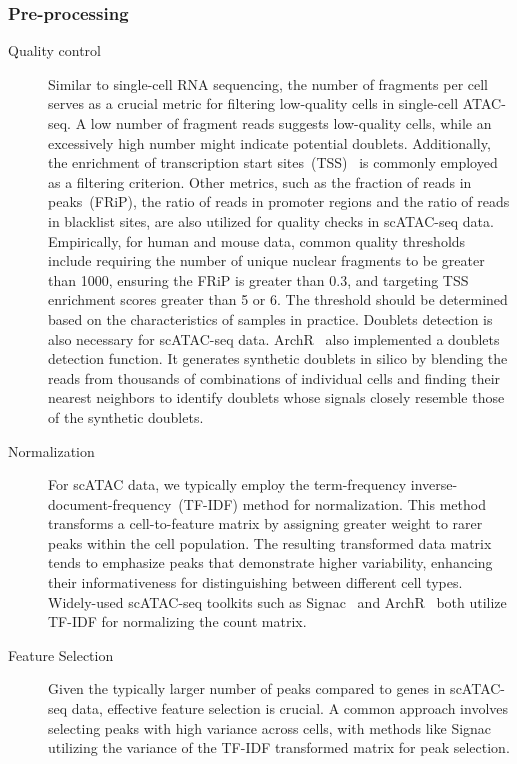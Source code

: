 \subsubsection{Pre-processing}
\begin{description}
	\item[Quality control]
	Similar to single-cell RNA sequencing, the number of fragments per cell serves as a crucial metric for filtering low-quality cells in single-cell ATAC-seq. A low number of fragment reads suggests low-quality cells, while an excessively high number might indicate potential doublets. Additionally, the enrichment of transcription start sites~(TSS)~\citep{Granja2021} is commonly employed as a filtering criterion. Other metrics, such as the fraction of reads in peaks~(FRiP), the ratio of reads in promoter regions and the ratio of reads in blacklist sites, are also utilized for quality checks in scATAC-seq data. Empirically, for human and mouse data, common quality thresholds include requiring the number of unique nuclear fragments to be greater than 1000, ensuring the FRiP is greater than 0.3, and targeting TSS enrichment scores greater than 5 or 6. The threshold should be determined based on the characteristics of samples in practice. Doublets detection is also necessary for scATAC-seq data. ArchR~\citep{Granja2021} also implemented a doublets detection function. It generates synthetic doublets in silico by blending the reads from thousands of combinations of individual cells and finding their nearest neighbors to identify doublets whose signals closely resemble those of the synthetic doublets.

	\item[Normalization]
	For scATAC data, we typically employ the term-frequency inverse-document-frequency~(TF-IDF) method for normalization. This method transforms a cell-to-feature
	matrix by assigning greater weight to rarer peaks within the cell population. The resulting transformed data matrix tends to emphasize peaks that demonstrate higher variability, enhancing their informativeness for distinguishing between different cell types. Widely-used scATAC-seq toolkits such as Signac~\citep{signac} and ArchR~\citep{granja2019single} both utilize TF-IDF for normalizing the count matrix.


	\item[Feature Selection]
	Given the typically larger number of peaks compared to genes in scATAC-seq data, effective feature selection is crucial. A common approach involves selecting peaks with high variance across cells, with methods like Signac~\citep{signac} utilizing the variance of the TF-IDF transformed matrix for peak selection.
\end{description}
